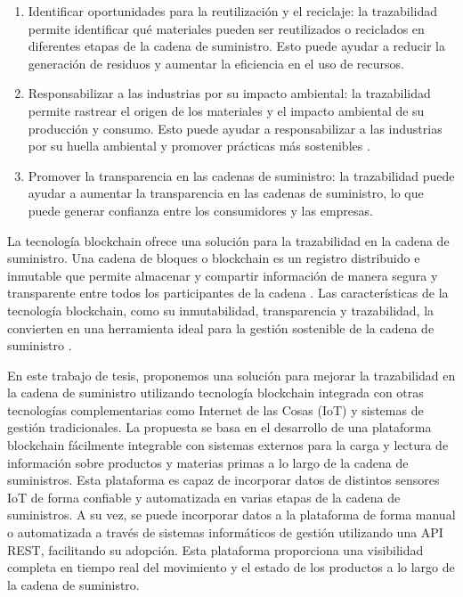 \documentclass[main.tex]{subfiles}
\begin{document}
\begin{enumerate}
	\item Identificar oportunidades para la reutilización y el reciclaje: la trazabilidad permite identificar qué materiales pueden ser reutilizados o reciclados en diferentes etapas de la cadena de suministro. Esto puede ayudar a reducir la generación de residuos y aumentar la eficiencia en el uso de recursos.

	\item Responsabilizar a las industrias por su impacto ambiental: la trazabilidad permite rastrear el origen de los materiales y el impacto ambiental de su producción y consumo. Esto puede ayudar a responsabilizar a las industrias por su huella ambiental y promover prácticas más sostenibles \cite{melendez2021economia}.

	\item Promover la transparencia en las cadenas de suministro: la trazabilidad puede ayudar a aumentar la transparencia en las cadenas de suministro, lo que puede generar confianza entre los consumidores y las empresas.
\end{enumerate}

La tecnología blockchain ofrece una solución para la trazabilidad en la cadena de suministro. Una cadena de bloques o blockchain es un registro distribuido e inmutable que permite almacenar y compartir información de manera segura y transparente entre todos los participantes de la cadena \cite{rennock2018blockchain}. Las características de la tecnología blockchain, como su inmutabilidad, transparencia y trazabilidad, la convierten en una herramienta ideal para la gestión sostenible de la cadena de suministro \cite{baralla2023waste, bulkowska2023implementation, alnuaimi2023blockchain}.

En este trabajo de tesis, proponemos una solución para mejorar la trazabilidad en la cadena de suministro utilizando tecnología blockchain integrada con otras tecnologías complementarias como Internet de las Cosas (IoT) y sistemas de gestión tradicionales. La propuesta se basa en el desarrollo de una plataforma blockchain fácilmente integrable con sistemas externos para la carga y lectura de información sobre productos y materias primas a lo largo de la cadena de suministros. Esta plataforma es capaz de incorporar datos de distintos sensores IoT de forma confiable y automatizada en varias etapas de la cadena de suministros. A su vez, se puede incorporar datos a la plataforma de forma manual o automatizada a través de sistemas informáticos de gestión utilizando una API REST, facilitando su adopción. Esta plataforma proporciona una visibilidad completa en tiempo real del movimiento y el estado de los productos a lo largo de la cadena de suministro.
\end{document}
